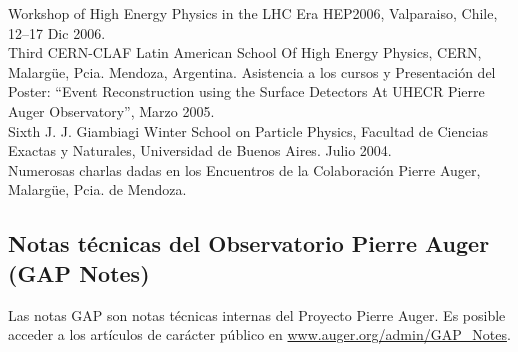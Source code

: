 \documentclass[11pt, a4paper]{article}
\newcommand{\years}[1]{\marginnote{\scriptsize #1}}
\begin{document}
Workshop of High Energy Physics in the LHC Era HEP2006, Valparaiso, Chile,
12--17 Dic 2006.\\
\years{2005}Third CERN-CLAF Latin American School Of High Energy Physics, CERN,
Malargüe, Pcia. Mendoza, Argentina. Asistencia a los cursos y Presentación del
Poster: “Event Reconstruction using the Surface Detectors At UHECR Pierre Auger
Observatory”, Marzo 2005.\\
\years{2004}Sixth J. J. Giambiagi Winter School on Particle Physics, Facultad
de Ciencias Exactas y Naturales, Universidad de Buenos Aires. Julio 2004.\\
\years{2005-2010} Numerosas charlas dadas en los Encuentros de la Colaboración
Pierre Auger, Malargüe, Pcia. de Mendoza.\\

\subsection*{Notas técnicas del Observatorio Pierre Auger (GAP Notes)}

Las notas GAP son notas técnicas internas del Proyecto Pierre Auger. Es posible
acceder a los artículos de carácter público en
\href{http://www.auger.org/admin-cgi-bin/woda/gap\_notes.pl/Search?search=asorey}
{www.auger.org/admin/GAP\_Notes}.\\
\end{document}
